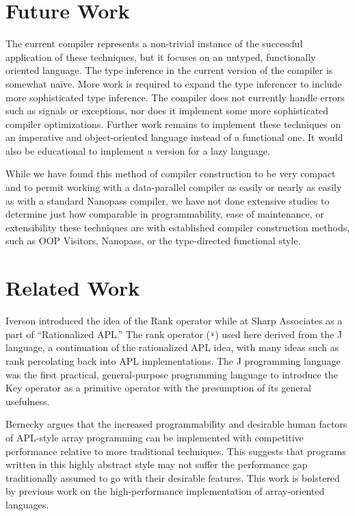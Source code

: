 ﻿\documentclass[numbers,10pt,preprint]{sigplanconf}
\begin{document}
\section{Future Work}

The current compiler represents a non-trivial instance of the successful application of these techniques, but it focuses on an untyped, functionally oriented language. The type inference in the current version of the compiler is somewhat na\"ive. More work is required to expand the type inferencer to include more sophisticated type inference. The compiler does not currently handle errors such as signals or exceptions, nor does it implement some more sophisticated compiler optimizations. Further work remains to implement these techniques on an imperative and object-oriented language instead of a functional one. It would also be educational to implement a version for a lazy language.

While we have found this method of compiler construction to be very compact and to permit working with a data-parallel compiler as easily or nearly as easily as with a standard Nanopass compiler, we have not done extensive studies to determine just how comparable in programmability, ease of maintenance, or extensibility these techniques are with established compiler construction methods, such as OOP Visitors, Nanopass, or the type-directed functional style.

\section{Related Work}

Iverson introduced the idea of the Rank operator while at Sharp Associates \cite{iverson1983rationalized} as a part of ``Rationalized APL.'' The rank operator (\verb;⍤;) used here derived from the J language, a continuation of the rationalized APL idea, with many ideas such as rank percolating back into APL implementations. \cite{bernecky1987rank,hui1995rank} The J programming language \cite{hui2014key} was the first practical, general-purpose programming language to introduce the Key operator as a primitive operator with the presumption of its general usefulness.

Bernecky \cite{bernecky2015abstract} argues that the increased programmability and desirable human factors of APL-style array programming can be implemented with competitive performance relative to more traditional techniques. This suggests that programs written in this highly abstract style may not suffer the performance gap traditionally assumed to go with their desirable features. This work is bolstered by previous work on the high-performance implementation of array-oriented languages. \cite{ching1994experimental,ching1993primitive, ching1990automatic,ju1991exploitation, ju1991performance,bernecky1999reducing,schwarz1991acorn}
\end{document}
